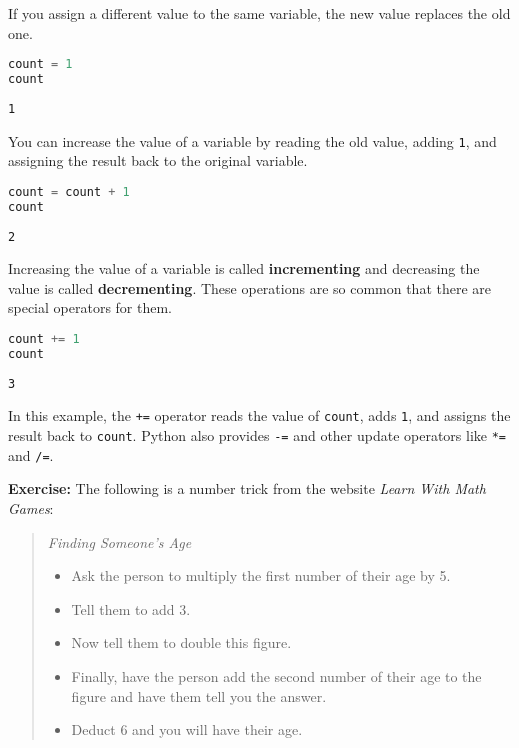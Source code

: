 If you assign a different value to the same variable, the new value
replaces the old one.

\begin{lstlisting}[language=Python,style=source]
count = 1
count
\end{lstlisting}

\begin{lstlisting}[style=output]
1
\end{lstlisting}

You can increase the value of a variable by reading the old value,
adding \passthrough{\lstinline!1!}, and assigning the result back to the
original variable.

\begin{lstlisting}[language=Python,style=source]
count = count + 1
count
\end{lstlisting}

\begin{lstlisting}[style=output]
2
\end{lstlisting}

Increasing the value of a variable is called \textbf{incrementing} and
decreasing the value is called \textbf{decrementing}. These operations
are so common that there are special operators for them.

\begin{lstlisting}[language=Python,style=source]
count += 1
count
\end{lstlisting}

\begin{lstlisting}[style=output]
3
\end{lstlisting}

In this example, the \passthrough{\lstinline!+=!} operator reads the
value of \passthrough{\lstinline!count!}, adds
\passthrough{\lstinline!1!}, and assigns the result back to
\passthrough{\lstinline!count!}. Python also provides
\passthrough{\lstinline!-=!} and other update operators like
\passthrough{\lstinline!*=!} and \passthrough{\lstinline!/=!}.

\textbf{Exercise:} The following is a number trick from the website
\emph{Learn With Math Games}:

\begin{quote}
\emph{Finding Someone's Age}

\begin{itemize}
\item
  Ask the person to multiply the first number of their age by 5.
\item
  Tell them to add 3.
\item
  Now tell them to double this figure.
\item
  Finally, have the person add the second number of their age to the
  figure and have them tell you the answer.
\item
  Deduct 6 and you will have their age.
\end{itemize}
\end{quote}

